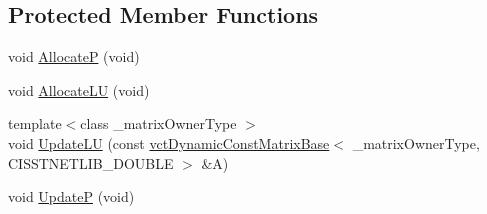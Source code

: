 \subsection*{Protected Member Functions}
\begin{DoxyCompactItemize}
\item 
void \hyperlink{classnmr_l_u_solver_aa6b9b7130bb8050e756ed056302f1634}{Allocate\-P} (void)
\item 
void \hyperlink{classnmr_l_u_solver_a58ce0aa8fc09a34a051eede8df6e7c9b}{Allocate\-L\-U} (void)
\item 
{\footnotesize template$<$class \-\_\-matrix\-Owner\-Type $>$ }\\void \hyperlink{classnmr_l_u_solver_ad57b9220fbfe71a397198413834af463}{Update\-L\-U} (const \hyperlink{classvct_dynamic_const_matrix_base}{vct\-Dynamic\-Const\-Matrix\-Base}$<$ \-\_\-matrix\-Owner\-Type, C\-I\-S\-S\-T\-N\-E\-T\-L\-I\-B\-\_\-\-D\-O\-U\-B\-L\-E $>$ \&A)
\item 
void \hyperlink{classnmr_l_u_solver_a769ea98a8a502b8a3cbf6e18e2371034}{Update\-P} (void)
\end{DoxyCompactItemize}
